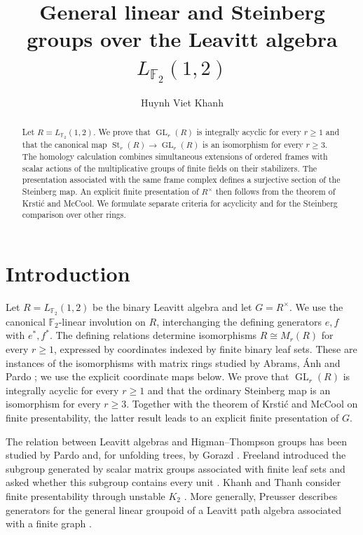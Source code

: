 \documentclass[11pt]{amsart}
\title{General linear and Steinberg groups over the Leavitt algebra $L_{\mathbb F_2}(1,2)$}
\author{Huynh Viet Khanh}
\date{}
\newcommand{\F}{\mathbb F}
\DeclareMathOperator{\GL}{GL}
\DeclareMathOperator{\St}{St}
\theoremstyle{definition}
\theoremstyle{remark}
\numberwithin{equation}{section}
\begin{document}
\begin{abstract}
Let $R=L_{\F_2}(1,2)$. We prove that $\GL_r(R)$ is integrally acyclic for every $r\geq1$ and that the canonical map $\St_r(R)\to\GL_r(R)$ is an isomorphism for every $r\geq3$. The homology calculation combines simultaneous extensions of ordered frames with scalar actions of the multiplicative groups of finite fields on their stabilizers. The presentation associated with the same frame complex defines a surjective section of the Steinberg map. An explicit finite presentation of $R^\times$ then follows from the theorem of Krsti\'c and McCool. We formulate separate criteria for acyclicity and for the Steinberg comparison over other rings.
\end{abstract}
\maketitle

\section{Introduction}

Let $R=L_{\F_2}(1,2)$ be the binary Leavitt algebra and let $G=R^\times$. We use the canonical $\F_2$-linear involution on $R$, interchanging the defining generators $e,f$ with $e^*,f^*$. The defining relations determine isomorphisms $R\cong M_r(R)$ for every $r\geq1$, expressed by coordinates indexed by finite binary leaf sets. These are instances of the isomorphisms with matrix rings studied by Abrams, \'{A}nh and Pardo \cite{AAP08}; we use the explicit coordinate maps below. We prove that $\GL_r(R)$ is integrally acyclic for every $r\geq1$ and that the ordinary Steinberg map is an isomorphism for every $r\geq3$. Together with the theorem of Krsti\'c and McCool on finite presentability, the latter result leads to an explicit finite presentation of $G$.

The relation between Leavitt algebras and Higman--Thompson groups has been studied by Pardo \cite{Pardo11} and, for unfolding trees, by Gorazd \cite{Gorazd26}. Freeland introduced the subgroup generated by scalar matrix groups associated with finite leaf sets and asked whether this subgroup contains every unit \cite[Definitions~4.3.9--4.3.10 and pp.~173--174]{Freeland19}. Khanh and Thanh consider finite presentability through unstable $K_2$ \cite[\S8]{KT26}. More generally, Preusser describes generators for the general linear groupoid of a Leavitt path algebra associated with a finite graph \cite[Theorem~4.13]{Preusser26}.
\end{document}
